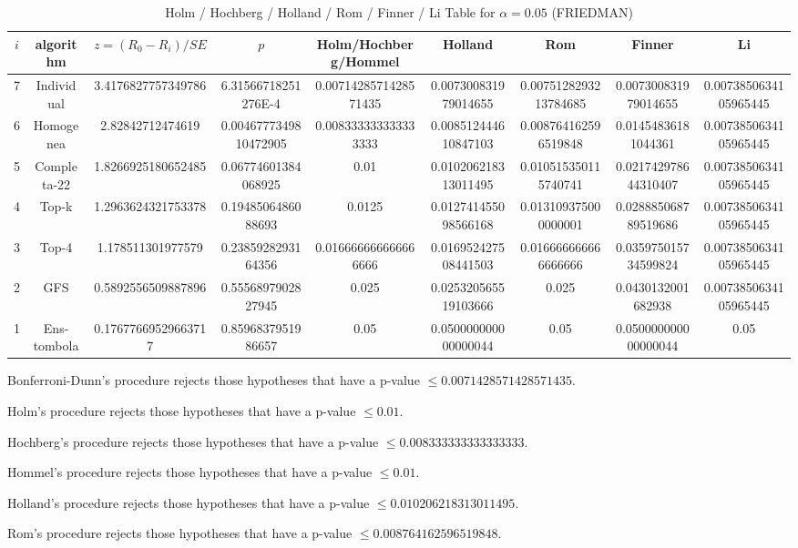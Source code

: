 \documentclass[a4paper,10pt]{article}
\begin{document}
\begin{landscape}
\begin{table}[!htp]
\begin{tabular}{
|r|r|r|r|r|r|r|r|r|}
\end{tabular}
\end{table}

\newpage

\begin{table}[!htp]
\centering\scriptsize
\caption{Holm / Hochberg / Holland / Rom / Finner / Li Table for $\alpha=0.05$ (FRIEDMAN)}
\begin{tabular}{ccccccccc}
$i$&algorithm&$z=(R_0 - R_i)/SE$&$p$&Holm/Hochberg/Hommel&Holland&Rom&Finner&Li\\
\hline
7&Individual&3.4176827757349786&6.31566718251276E-4&0.0071428571428571435&0.007300831979014655&0.0075128293213784685&0.007300831979014655&0.0073850634105965445\\
6&Homogenea&2.82842712474619&0.0046777349810472905&0.008333333333333333&0.008512444610847103&0.008764162596519848&0.01454836181044361&0.0073850634105965445\\
5&Completa-22&1.8266925180652485&0.06774601384068925&0.01&0.010206218313011495&0.010515350115740741&0.021742978644310407&0.0073850634105965445\\
4&Top-k&1.2963624321753378&0.1948506486088693&0.0125&0.012741455098566168&0.013109375000000001&0.028885068789519686&0.0073850634105965445\\
3&Top-4&1.178511301977579&0.2385928293164356&0.016666666666666666&0.016952427508441503&0.016666666666666666&0.035975015734599824&0.0073850634105965445\\
2&GFS&0.5892556509887896&0.5556897902827945&0.025&0.025320565519103666&0.025&0.0430132001682938&0.0073850634105965445\\
1&Ens-tombola&0.17677669529663717&0.8596837951986657&0.05&0.050000000000000044&0.05&0.050000000000000044&0.05\\
\hline
\end{tabular}
\end{table}
Bonferroni-Dunn's procedure rejects those hypotheses that have a p-value $\le0.0071428571428571435$.


Holm's procedure rejects those hypotheses that have a p-value $\le0.01$.


Hochberg's procedure rejects those hypotheses that have a p-value $\le0.008333333333333333$.


Hommel's procedure rejects those hypotheses that have a p-value $\le0.01$.


Holland's procedure rejects those hypotheses that have a p-value $\le0.010206218313011495$.


Rom's procedure rejects those hypotheses that have a p-value $\le0.008764162596519848$.



\end{landscape}
\end{document}
